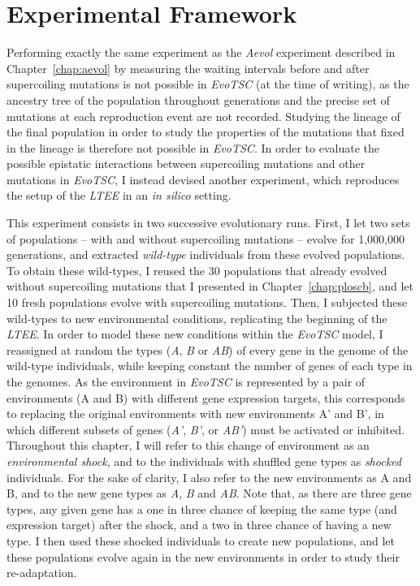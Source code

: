 \section{Experimental Framework}

Performing exactly the same experiment as the \emph{Aevol} experiment described in Chapter~\ref{chap:aevol} by measuring the waiting intervals before and after supercoiling mutations is not possible in \emph{EvoTSC} (at the time of writing), as the ancestry tree of the population throughout generations and the precise set of mutations at each reproduction event are not recorded.
Studying the lineage of the final population in order to study the properties of the mutations that fixed in the lineage is therefore not possible in \emph{EvoTSC}.
In order to evaluate the possible epistatic interactions between supercoiling mutations and other mutations in \emph{EvoTSC}, I instead devised another experiment, which reproduces the setup of the \emph{LTEE} in an \emph{in silico} setting.

This experiment consists in two successive evolutionary runs.
First, I let two sets of populations -- with and without supercoiling mutations -- evolve for 1,000,000 generations, and extracted \emph{wild-type} individuals from these evolved populations.
To obtain these wild-types, I reused the 30 populations that already evolved without supercoiling mutations that I presented in Chapter~\ref{chap:ploscb}, and let 10 fresh populations evolve with supercoiling mutations.
Then, I subjected these wild-types to new environmental conditions, replicating the beginning of the \emph{LTEE}.
In order to model these new conditions within the \emph{EvoTSC} model, I reassigned at random the types (\emph{A}, \emph{B} or \emph{AB}) of every gene in the genome of the wild-type individuals, while keeping constant the number of genes of each type in the genomes.
As the environment in \emph{EvoTSC} is represented by a pair of environments (A and B) with different gene expression targets, this corresponds to replacing the original environments with new environments A' and B', in which different subsets of genes (\emph{A'}, \emph{B'}, or \emph{AB'}) must be activated or inhibited.
Throughout this chapter, I will refer to this change of environment as an \emph{environmental shock}, and to the individuals with shuffled gene types as \emph{shocked} individuals.
For the sake of clarity, I also refer to the new environments as A and B, and to the new gene types as \emph{A}, \emph{B} and \emph{AB}.
Note that, as there are three gene types, any given gene has a one in three chance of keeping the same type (and expression target) after the shock, and a two in three chance of having a new type.
I then used these shocked individuals to create new populations, and let these populations evolve again in the new environments in order to study their re-adaptation.

